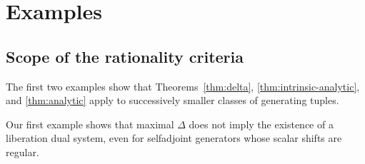 \section{Examples}
\label{sec:examples}

\subsection{Scope of the rationality criteria}

The first two examples show that Theorems~\ref{thm:delta}, \ref{thm:intrinsic-analytic}, and \ref{thm:analytic} apply to successively smaller classes of generating tuples.

Our first example shows that maximal $\Delta$ does not imply the existence of a liberation dual system, even for selfadjoint generators whose scalar shifts are regular.

